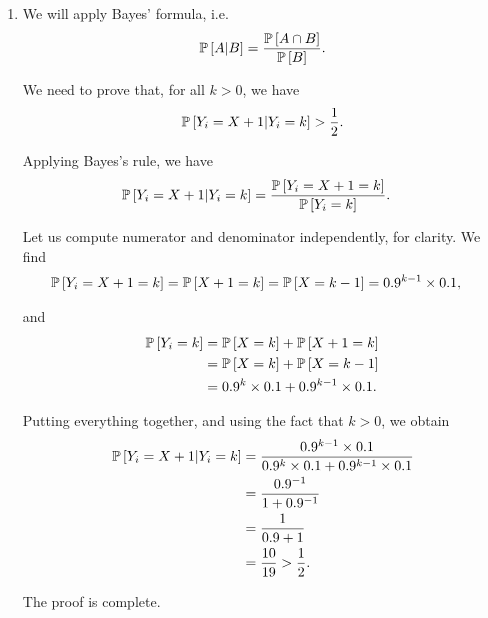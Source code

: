 \begin{enumerate}[label=\alph*.]
  
  
  \item We will apply Bayes' formula, i.e.
  \begin{equation*}
    \mathbb{P} \squared{A | B} = \dfrac{\mathbb{P} \squared{A \cap B}}{\mathbb{P} \squared{B}}.
  \end{equation*}
  
  We need to prove that, for all $k >0$, we have
  \begin{equation*}
    \mathbb{P} \squared{Y_i = X+1 | Y_i = k} > \dfrac{1}{2}.
  \end{equation*}
  
  Applying Bayes's rule, we have 
  \begin{align*}
      \mathbb{P} \squared{Y_i = X+1 | Y_i = k}
      &= \dfrac{\mathbb{P} \squared{Y_i = X+1 = k}}{\mathbb{P} \squared{Y_i = k}}.
  \end{align*}
  
  Let us compute numerator and denominator independently, for clarity. We find
  \begin{align*}
      \mathbb{P} \squared{Y_i = X+1 = k}
      &= \mathbb{P} \squared{X+1 = k}
      = \mathbb{P} \squared{X = k-1}
      = 0.9 ^{k-1} \times 0.1,
  \end{align*}
  
  and
  \begin{align*}
      \mathbb{P} \squared{Y_i = k}
      &= \mathbb{P} \squared{X = k} + \mathbb{P} \squared{X+1 = k} \\
      &= \mathbb{P} \squared{X = k} + \mathbb{P} \squared{X = k-1} \\
      &= 0.9 ^{k} \times 0.1 + 0.9 ^{k-1} \times 0.1.
  \end{align*}
  
  Putting everything together,  and using the fact that $k >0$, we obtain
  \begin{align*}
      \mathbb{P} \squared{Y_i = X+1 | Y_i = k}
      &= \dfrac{0.9 ^{k-1} \times 0.1}{0.9 ^{k} \times 0.1 + 0.9 ^{k-1} \times 0.1} \\
      &= \dfrac{0.9 ^{-1}}{1 + 0.9 ^{-1}} \\
      &= \dfrac{1}{0.9 + 1} \\
      &= \dfrac{10}{19} > \dfrac{1}{2}.
      \end{align*}
  
  The proof is complete.
  

\end{enumerate}

